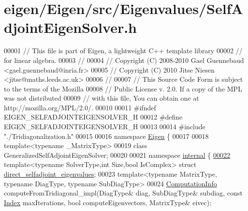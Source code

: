 \hypertarget{eigen_2_eigen_2src_2_eigenvalues_2_self_adjoint_eigen_solver_8h_source}{}\section{eigen/\+Eigen/src/\+Eigenvalues/\+Self\+Adjoint\+Eigen\+Solver.h}
\label{eigen_2_eigen_2src_2_eigenvalues_2_self_adjoint_eigen_solver_8h_source}

\begin{DoxyCode}
00001 \textcolor{comment}{// This file is part of Eigen, a lightweight C++ template library}
00002 \textcolor{comment}{// for linear algebra.}
00003 \textcolor{comment}{//}
00004 \textcolor{comment}{// Copyright (C) 2008-2010 Gael Guennebaud <gael.guennebaud@inria.fr>}
00005 \textcolor{comment}{// Copyright (C) 2010 Jitse Niesen <jitse@maths.leeds.ac.uk>}
00006 \textcolor{comment}{//}
00007 \textcolor{comment}{// This Source Code Form is subject to the terms of the Mozilla}
00008 \textcolor{comment}{// Public License v. 2.0. If a copy of the MPL was not distributed}
00009 \textcolor{comment}{// with this file, You can obtain one at http://mozilla.org/MPL/2.0/.}
00010 
00011 \textcolor{preprocessor}{#ifndef EIGEN\_SELFADJOINTEIGENSOLVER\_H}
00012 \textcolor{preprocessor}{#define EIGEN\_SELFADJOINTEIGENSOLVER\_H}
00013 
00014 \textcolor{preprocessor}{#include "./Tridiagonalization.h"}
00015 
00016 \textcolor{keyword}{namespace }\hyperlink{namespace_eigen}{Eigen} \{ 
00017 
00018 \textcolor{keyword}{template}<\textcolor{keyword}{typename} \_MatrixType>
00019 \textcolor{keyword}{class }GeneralizedSelfAdjointEigenSolver;
00020 
00021 \textcolor{keyword}{namespace }\hyperlink{namespaceinternal}{internal} \{
\hyperlink{struct_eigen_1_1internal_1_1direct__selfadjoint__eigenvalues}{00022} \textcolor{keyword}{template}<\textcolor{keyword}{typename} SolverType,\textcolor{keywordtype}{int} Size,\textcolor{keywordtype}{bool} IsComplex> \textcolor{keyword}{struct }
      \hyperlink{struct_eigen_1_1internal_1_1direct__selfadjoint__eigenvalues}{direct\_selfadjoint\_eigenvalues};
00023 \textcolor{keyword}{template}<\textcolor{keyword}{typename} MatrixType, \textcolor{keyword}{typename} DiagType, \textcolor{keyword}{typename} SubDiagType>
00024 \hyperlink{group__enums_ga85fad7b87587764e5cf6b513a9e0ee5e}{ComputationInfo} computeFromTridiagonal\_impl(DiagType& diag, SubDiagType& subdiag, \textcolor{keyword}{const} 
      \hyperlink{namespace_eigen_a62e77e0933482dafde8fe197d9a2cfde}{Index} maxIterations, \textcolor{keywordtype}{bool} computeEigenvectors, MatrixType& eivec);

\end{DoxyCode}
